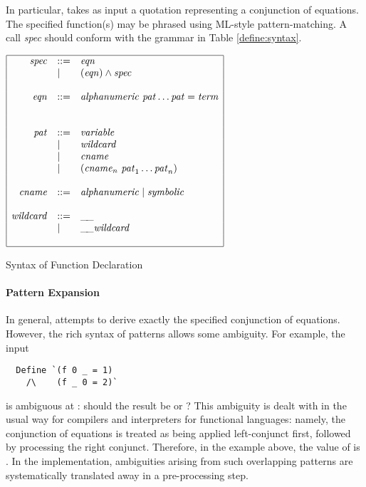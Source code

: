  In particular,  takes as input a quotation representing a
conjunction of equations. The specified function(s) may be phrased
using ML-style pattern-matching. A call
\textit{spec} should conform with the grammar in Table
\ref{define:syntax}.
\begin{table}[htbp]
\begin{center}
$
\begin{array}{|rll|}
\hline
\mathit{spec} & ::= &  \mathit{eqn} \\
              & \mid  & (\mathit{eqn}) \land \mathit{spec} \\
  & & \\
\mathit{eqn} & ::= & \mathit{alphanumeric}\ \mathit{pat} \ldots \mathit{pat} = \mathit{term} \\
  & & \\
  & & \\
\mathit{pat} & ::= & \mathit{variable} \\
    & \mid   & \mathit{wildcard} \\
    & \mid   & \mathit{cname} \\
    & \mid   & (\mathit{cname}_n\ \mathit{pat}_1 \ldots \mathit{pat}_n) \\
  & & \\
\mathit{cname} & ::= & \mathit{alphanumeric} \mid \mathit{symbolic} \\
  & & \\
\mathit{wildcard} & ::=  & \_\!\_ \\
                  & \mid & \_\!\_ \mathit{wildcard} \\
  & & \\
\hline
\end{array}
$
\caption{Syntax of Function Declaration}\label{define:syntax}
\end{center}
\end{table}

\paragraph{Pattern Expansion}
In general,  attempts to derive exactly the specified
conjunction of equations. However, the rich syntax of patterns allows
some ambiguity. For example, the input
%
\begin{hol}
\begin{verbatim}
  Define `(f 0 _ = 1)
    /\    (f _ 0 = 2)`
\end{verbatim}
\end{hol}
%
is ambiguous at : should the result be  or
?  This ambiguity is dealt with in the usual way for compilers and
interpreters for functional languages: namely, the conjunction of
equations is treated as being applied left-conjunct first, followed
by processing the right conjunct. Therefore, in the example above, the
value of  is . In the implementation,
ambiguities arising from such overlapping patterns are systematically
translated away in a pre-processing step.

